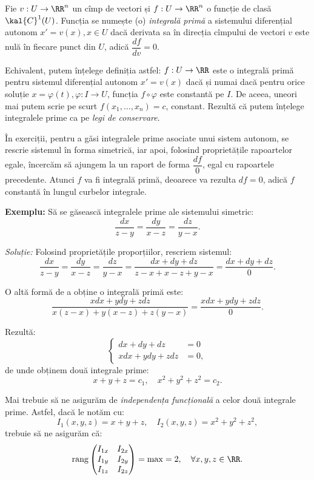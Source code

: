 \begin{definition}\label{def:int-prim}
  Fie $ v : U \to \RR^n $ un cîmp de vectori și $ f : U \to \RR^n $ o funcție
  de clasă $ \kal{C}^1(U) $. Funcția se numește (o) \emph{integrală primă} a
  sistemului diferențial autonom $ x' = v(x), x \in U $ dacă derivata sa
  în direcția cîmpului de vectori $ v $ este nulă în fiecare punct din
  $ U $, adică $ \dfrac{df}{dv} = 0 $.
\end{definition}

Echivalent, putem înțelege definiția astfel: $ f : U \to \RR $ este o
integrală primă pentru sistemul diferențial autonom $ x' = v(x) $ dacă
și numai dacă pentru orice soluție $ x = \varphi(t), \varphi : I \to U $,
funcția $ f \circ \varphi $ este constantă pe $ I $. De aceea, uneori
mai putem scrie pe scurt $ f(x_1, \dots, x_n) = c $, constant. Rezultă
că putem înțelege integralele prime ca pe \emph{legi de conservare}.

În exerciții, pentru a găsi integralele prime asociate unui sistem autonom,
se rescrie sistemul în forma simetrică, iar apoi, folosind proprietățile rapoartelor
egale, încercăm să ajungem la un raport de forma $ \dfrac{df}{0} $, egal cu
rapoartele precedente. Atunci $ f $ va fi integrală primă, deoarece va
rezulta $ df = 0 $, adică $ f $ constantă în lungul curbelor integrale.

\textbf{Exemplu:} Să se găsească integralele prime ale sistemului simetric:
\[
  \dfrac{dx}{z - y} = \dfrac{dy}{x - z} = \dfrac{dz}{y - x}.
\]

\emph{Soluție:} Folosind proprietățile proporțiilor, rescriem sistemul:
\[
  \dfrac{dx}{z - y} = \dfrac{dy}{x - z} = \dfrac{dz}{y - x} = %
  \dfrac{dx + dy + dz}{z - x + x - z + y - x} = %
  \dfrac{dx + dy + dz}{0}.
\]

O altă formă de a obține o integrală primă este:
\[
  \dfrac{xdx + ydy + zdz}{x(z - x) + y(x - z) + z(y - x)} = %
  \dfrac{xdx + ydy + zdz}{0}.
\]

Rezultă:
\[
  \begin{cases}
    dx + dy + dz &= 0 \\
    xdx + ydy + zdz &= 0,
  \end{cases}
\]
de unde obținem două integrale prime:
\[
  x + y + z = c_1, \quad x^2 + y^2 + z^2 = c_2.
\]

Mai trebuie să ne asigurăm de \emph{independența funcțională} a celor
două integrale prime. Astfel, dacă le notăm cu:
\[
  I_1(x, y, z) = x + y + z, \quad I_2(x, y, z) = x^2 + y^2 + z^2,
\]
trebuie să ne asigurăm că:
\[
  \mathrm{rang} \begin{pmatrix}
    I_{1x} & I_{2x} \\
    I_{1y} & I_{2y} \\
    I_{1z} & I_{2z}
  \end{pmatrix} = \mathrm{max} = 2, \quad \forall x, y, z \in \RR.
\]

